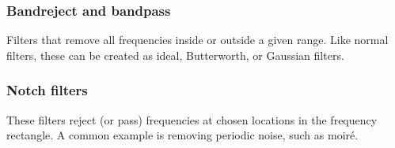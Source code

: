 \subsubsection{Bandreject and bandpass}
Filters that remove all frequencies inside or outside a given range. Like normal filters, these can be created as ideal, Butterworth, or Gaussian filters.

\subsubsection{Notch filters}
These filters reject (or pass) frequencies at chosen locations in the frequency rectangle. A common example is removing periodic noise, such as moiré.
